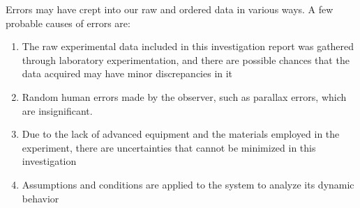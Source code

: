 {Errors may have crept into our raw and ordered data in various ways. A few probable causes of errors are:}
      
      \begin{enumerate}
          \item {The raw experimental data included in this investigation report was gathered through laboratory experimentation, and there are possible chances that the data acquired may have minor discrepancies in it}
          \item {Random human errors made by the observer, such as parallax errors, which are insignificant.}
          \item {Due to the lack of advanced equipment and the materials employed in the experiment, there are uncertainties that cannot be minimized in this investigation}
          \item {Assumptions and conditions are applied to the system to analyze its dynamic behavior}
      \end{enumerate}

